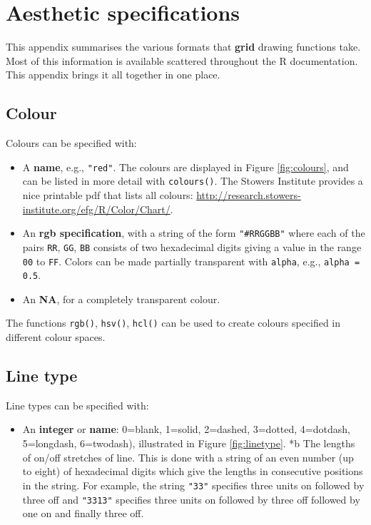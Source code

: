 \chapter{Aesthetic specifications}\label{cha:specifications}

This appendix summarises the various formats that \textbf{grid} drawing
functions take. Most of this information is available scattered
throughout the R documentation. This appendix brings it all together in
one place. 

\section{Colour}\label{sec:colourux5fspec}

Colours can be specified with: 

\begin{itemize}
\itemsep1pt\parskip0pt
\item
  A \textbf{name}, e.g., \texttt{"red"}. The colours are displayed in
  Figure \ref{fig:colours}, and can be listed in more detail with
  \texttt{colours()}. The Stowers Institute provides a nice printable
  pdf that lists all colours:
  \url{http://research.stowers-institute.org/efg/R/Color/Chart/}.
\item
  An \textbf{rgb specification}, with a string of the form
  \texttt{"\#RRGGBB"} where each of the pairs \texttt{RR}, \texttt{GG},
  \texttt{BB} consists of two hexadecimal digits giving a value in the
  range \texttt{00} to \texttt{FF}. Colors can be made partially
  transparent with \texttt{alpha}, e.g., \texttt{alpha = 0.5}.
\item
  An \textbf{NA}, for a completely transparent colour.
\end{itemize}

The functions \texttt{rgb()}, \texttt{hsv()}, \texttt{hcl()} can be used
to create colours specified in different colour spaces.

\section{Line type}\label{sec:line-type-spec}

Line types can be specified with: 

\begin{itemize}
\itemsep1pt\parskip0pt
\item
  An \textbf{integer} or \textbf{name}: 0=blank, 1=solid, 2=dashed,
  3=dotted, 4=dotdash, 5=longdash, 6=twodash), illustrated in Figure
  \ref{fig:linetype}. *b The lengths of on/off stretches of line. This
  is done with a string of an even number (up to eight) of hexadecimal
  digits which give the lengths in consecutive positions in the string.
  For example, the string \texttt{"33"} specifies three units on
  followed by three off and \texttt{"3313"} specifies three units on
  followed by three off followed by one on and finally three off.
\end{itemize}

